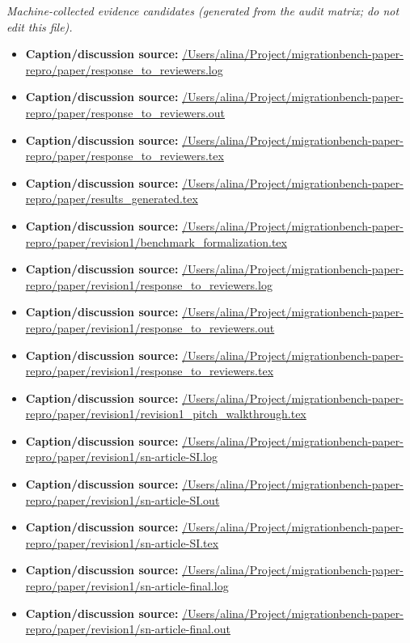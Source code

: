 \emph{Machine-collected evidence candidates (generated from the audit matrix; do not edit this file).}
\begin{itemize}[leftmargin=1.4em,noitemsep]
\item \textbf{Caption/discussion source:} \url{/Users/alina/Project/migrationbench-paper-repro/paper/response_to_reviewers.log}
\item \textbf{Caption/discussion source:} \url{/Users/alina/Project/migrationbench-paper-repro/paper/response_to_reviewers.out}
\item \textbf{Caption/discussion source:} \url{/Users/alina/Project/migrationbench-paper-repro/paper/response_to_reviewers.tex}
\item \textbf{Caption/discussion source:} \url{/Users/alina/Project/migrationbench-paper-repro/paper/results_generated.tex}
\item \textbf{Caption/discussion source:} \url{/Users/alina/Project/migrationbench-paper-repro/paper/revision1/benchmark_formalization.tex}
\item \textbf{Caption/discussion source:} \url{/Users/alina/Project/migrationbench-paper-repro/paper/revision1/response_to_reviewers.log}
\item \textbf{Caption/discussion source:} \url{/Users/alina/Project/migrationbench-paper-repro/paper/revision1/response_to_reviewers.out}
\item \textbf{Caption/discussion source:} \url{/Users/alina/Project/migrationbench-paper-repro/paper/revision1/response_to_reviewers.tex}
\item \textbf{Caption/discussion source:} \url{/Users/alina/Project/migrationbench-paper-repro/paper/revision1/revision1_pitch_walkthrough.tex}
\item \textbf{Caption/discussion source:} \url{/Users/alina/Project/migrationbench-paper-repro/paper/revision1/sn-article-SI.log}
\item \textbf{Caption/discussion source:} \url{/Users/alina/Project/migrationbench-paper-repro/paper/revision1/sn-article-SI.out}
\item \textbf{Caption/discussion source:} \url{/Users/alina/Project/migrationbench-paper-repro/paper/revision1/sn-article-SI.tex}
\item \textbf{Caption/discussion source:} \url{/Users/alina/Project/migrationbench-paper-repro/paper/revision1/sn-article-final.log}
\item \textbf{Caption/discussion source:} \url{/Users/alina/Project/migrationbench-paper-repro/paper/revision1/sn-article-final.out}

\end{itemize}
